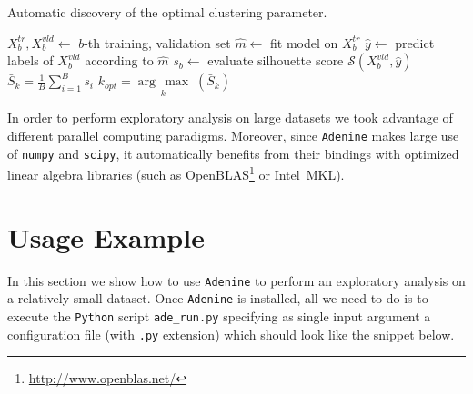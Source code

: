\documentclass[twoside,11pt]{article}
\makeatletter
\newcommand{\argmax}[1]{\underset{#1}{\operatorname{arg}\,\operatorname{max}}\;}
\newcommand{\ade}{\texttt{Adenine}\@\xspace}
\newcommand{\py}{\texttt{Python}\@\xspace}
\makeatother
\begin{document}
\begin{enumerate}[leftmargin=*]
\begin{algorithm}
\caption{Automatic discovery of the optimal clustering parameter.}\label{alg:clusters}
\label{alg:clusters}
\begin{algorithmic}[1]
                \State $X^{tr}_b,X^{vld}_b\leftarrow$ $b$-th training, validation set
                \State $\hat{m}\leftarrow$ fit model on $X^{tr}_b$
                \State $\hat{y}\leftarrow$ predict labels of $X^{vld}_b$ according to $\hat{m}$
                \State $s_b\leftarrow$ evaluate silhouette score  $\mathcal{S}(X^{vld}_b,\hat{y})$
	\EndFor    
	\State $\bar{S}_k = \frac{1}{B}\sum_{i=1}^B s_i$
\EndFor
\State $k_{opt} = \argmax{k}(\bar{S}_k)$
\end{algorithmic}
\end{algorithm}

\end{enumerate}

\noindent In order to perform exploratory analysis on large datasets we took advantage of different parallel computing paradigms. %
Moreover, since \ade makes large use of \texttt{numpy} and \texttt{scipy}, it automatically benefits from their bindings with optimized linear algebra libraries (such as OpenBLAS\footnote{\url{http://www.openblas.net/}} or Intel\textsuperscript{\textregistered}~MKL).

\section{Usage Example}
In this section we show how to use \ade to perform an exploratory analysis on a relatively small dataset. Once \ade is installed, all we need to do is to execute the \py script \texttt{ade\_run.py} specifying as single input argument a configuration file (with \texttt{.py} extension) which should look like the snippet below.
 

\end{document}
